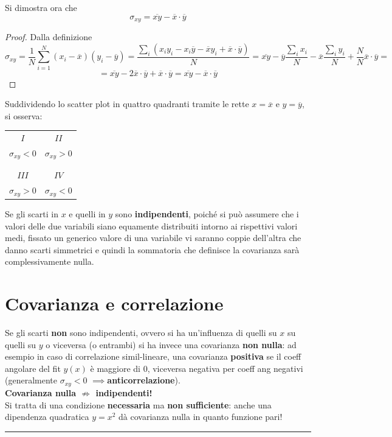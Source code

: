 \documentclass[10pt, oneside]{book}
\newcommand{\infobox}[2]{\vspace{0.5cm}~\\ \textbf{#1} \hrulefill \vspace{0.2cm}\\#2 {}\,\\\hrule \vspace{0.5cm}}
\newcommand{\imp}{$\implies$}
\newcommand{\cov}{\sigma_{xy}}
\begin{document}
Si dimostra ora che
\[\sigma_{xy} = \overline{xy} - \overline{x} \cdot \overline{y}\]
\begin{proof}
Dalla definizione
\[\sigma_{xy} = \frac{1}{N} \sum\limits_{i=1}^N (x_i - \overline{x}) (y_i - \overline{y}) = \frac{\sum_i (x_i y_i - x_i \overline{y} - \overline{x} y_i + \overline{x} \cdot \overline{y})}{N} = \overline{xy} - \overline{y} \frac{\sum_i x_i}{N} - \overline{x} \frac{\sum_i y_i}{N} + \frac{N}{N} \overline{x} \cdot \overline{y} =\]
\[= \overline{xy} - 2 \overline{x} \cdot \overline{y} + \overline{x} \cdot \overline{y} = \overline{xy} - \overline{x} \cdot \overline{y}\]
\end{proof}
\newpage
Suddividendo lo scatter plot in quattro quadranti tramite le rette $x = \overline{x}$ e $y = \overline{y}$, si osserva:

\begin{table}[h!]
\centering
\begin{tabular}{c c | c c}
\multicolumn{2}{c|}{$I$} & \multicolumn{2}{|c}{$II$}\\
\multicolumn{2}{c|}{$\cov < 0$} & \multicolumn{2}{|c}{$\cov > 0$}\\
& & & \\\hline
& & & \\
\multicolumn{2}{c|}{$III$} & \multicolumn{2}{|c}{$IV$}\\
\multicolumn{2}{c|}{$\cov > 0$} & \multicolumn{2}{|c}{$\cov < 0$}
\end{tabular}
\end{table}

Se gli scarti in $x$ e quelli in $y$ sono \textbf{indipendenti}, poiché si può assumere che i valori delle due variabili siano equamente distribuiti intorno ai rispettivi valori medi, fissato un generico valore di una variabile vi saranno coppie dell'altra che danno scarti simmetrici e quindi la sommatoria che definisce la covarianza sarà complessivamente nulla.

\section{Covarianza e correlazione}
Se gli scarti \textbf{non} sono indipendenti, ovvero si ha un'influenza di quelli su $x$ su quelli su $y$ o viceversa (o entrambi) si ha invece una covarianza \textbf{non nulla}: ad esempio in caso di correlazione simil-lineare, una covarianza \textbf{positiva} se il coeff angolare del fit $y(x)$ è maggiore di 0, viceversa negativa per coeff ang negativi (generalmente $\cov < 0$ \imp \textbf{anticorrelazione}).
\infobox{Covarianza nulla $\nRightarrow$ indipendenti!}{
Si tratta di una condizione \textbf{necessaria} ma \textbf{non sufficiente}: anche una dipendenza quadratica $y = x^2$ dà covarianza nulla in quanto funzione pari!
}
\end{document}
